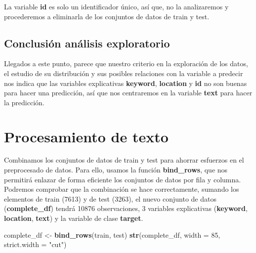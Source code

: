 \documentclass[]{article}
\newenvironment{Shaded}{\begin{snugshade}}{\end{snugshade}}
\newcommand{\DataTypeTok}[1]{\textcolor[rgb]{0.13,0.29,0.53}{#1}}
\newcommand{\DecValTok}[1]{\textcolor[rgb]{0.00,0.00,0.81}{#1}}
\newcommand{\KeywordTok}[1]{\textcolor[rgb]{0.13,0.29,0.53}{\textbf{#1}}}
\newcommand{\NormalTok}[1]{#1}
\newcommand{\OperatorTok}[1]{\textcolor[rgb]{0.81,0.36,0.00}{\textbf{#1}}}
\newcommand{\OtherTok}[1]{\textcolor[rgb]{0.56,0.35,0.01}{#1}}
\newcommand{\StringTok}[1]{\textcolor[rgb]{0.31,0.60,0.02}{#1}}
\begin{document}
La variable \textbf{id} es solo un identificador único, así que, no la
analizaremos y procederemos a eliminarla de los conjuntos de datos de
train y test.

\begin{Shaded}
\end{Shaded}

\hypertarget{conclusiuxf3n-anuxe1lisis-exploratorio}{%
\subsection{Conclusión análisis
exploratorio}\label{conclusiuxf3n-anuxe1lisis-exploratorio}}

Llegados a este punto, parece que nuestro criterio en la exploración de
los datos, el estudio de su distribución y sus posibles relaciones con
la variable a predecir nos indica que las variables explicativas
\textbf{keyword}, \textbf{location} y \textbf{id} no son buenas para
hacer una predicción, así que nos centraremos en la variable
\textbf{text} para hacer la predicción.

\hypertarget{procesamiento-de-texto}{%
\section{Procesamiento de texto}\label{procesamiento-de-texto}}

Combinamos los conjuntos de datos de train y test para ahorrar esfuerzos
en el preprocesado de datos. Para ello, usamos la función
\textbf{bind\_rows}, que nos permitirá enlazar de forma eficiente los
conjuntos de datos por fila y columna. Podremos comprobar que la
combinación se hace correctamente, sumando los elementos de train (7613)
y de test (3263), el nuevo conjunto de datos (\textbf{complete\_df})
tendrá 10876 observaciones, 3 variables explicativas (\textbf{keyword},
\textbf{location}, \textbf{text}) y la variable de clase
\textbf{target}.

\begin{Shaded}
\begin{Highlighting}[]
\NormalTok{complete_df <-}\StringTok{ }\KeywordTok{bind_rows}\NormalTok{(train, test)}
\KeywordTok{str}\NormalTok{(complete_df, }\DataTypeTok{width =} \DecValTok{85}\NormalTok{, }\DataTypeTok{strict.width =} \StringTok{"cut"}\NormalTok{)}
\end{Highlighting}
\end{Shaded}
\end{document}
